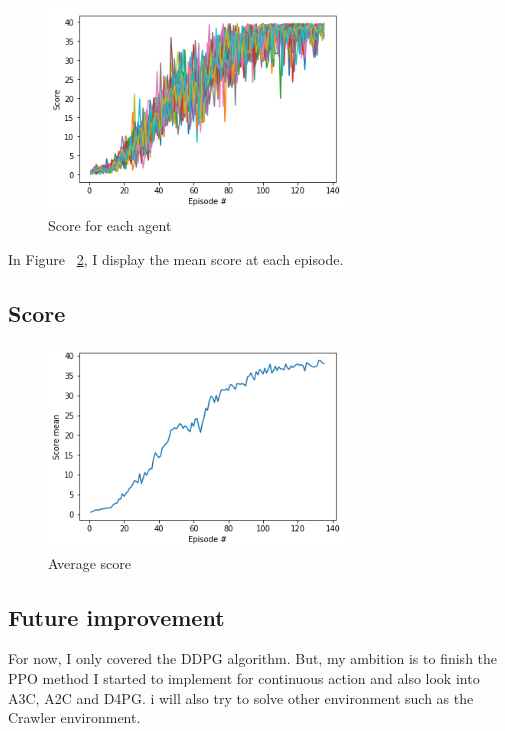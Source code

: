 \documentclass[12pt]{article}
\begin{document}
\begin{center}
\begin{figure}[H]
  \center
  \includegraphics[width=0.7\textwidth]{../PNG/average_score_all.png}
  \caption{Score for each agent}
  \label{fig:average_score_all}
\end{figure}
\end{center}

In Figure ~\ref{fig:average_score}, I display the mean score at each episode.
\subsection{Score}
\begin{center}
\begin{figure}[H]
  \center
  \includegraphics[width=0.7\textwidth]{../PNG/average_score.png}
  \caption{Average score}
  \label{fig:average_score}
\end{figure}
\end{center}

\subsection{Future improvement}
For now, I only covered the DDPG\cite{LillicrapHPHETS15} algorithm. But, my ambition is to finish the PPO method\cite{ClaveraRS0AA18} I started to implement for continuous action and also look into A3C\cite{MnihBMGLHSK16}, A2C\cite{MnihBMGLHSK16} and D4PG\cite{Barth2018}. i will also try to solve other environment such as the Crawler environment.


\end{document}
